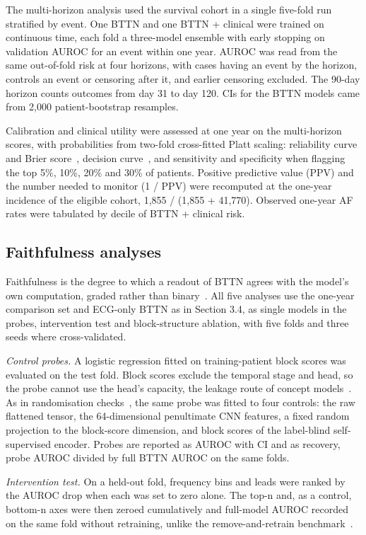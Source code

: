 \documentclass[preprint,12pt]{elsarticle}
\begin{document}
The multi-horizon analysis used the survival cohort in a single five-fold run stratified by event. One BTTN and one BTTN + clinical were trained on continuous time, each fold a three-model ensemble with early stopping on validation AUROC for an event within one year. AUROC was read from the same out-of-fold risk at four horizons, with cases having an event by the horizon, controls an event or censoring after it, and earlier censoring excluded. The 90-day horizon counts outcomes from day 31 to day 120. CIs for the BTTN models came from 2,000 patient-bootstrap resamples.

Calibration and clinical utility were assessed at one year on the multi-horizon scores, with probabilities from two-fold cross-fitted Platt scaling: reliability curve and Brier score~\cite{vancalster2019}, decision curve~\cite{vickers2006}, and sensitivity and specificity when flagging the top 5\%, 10\%, 20\% and 30\% of patients. Positive predictive value (PPV) and the number needed to monitor (1 / PPV) were recomputed at the one-year incidence of the eligible cohort, 1,855 / (1,855 + 41,770). Observed one-year AF rates were tabulated by decile of BTTN + clinical risk.

\subsection{Faithfulness analyses}

Faithfulness is the degree to which a readout of BTTN agrees with the model's own computation, graded rather than binary~\cite{jacovi2020}. All five analyses use the one-year comparison set and ECG-only BTTN as in Section 3.4, as single models in the probes, intervention test and block-structure ablation, with five folds and three seeds where cross-validated.

\textit{Control probes.} A logistic regression fitted on training-patient block scores was evaluated on the test fold. Block scores exclude the temporal stage and head, so the probe cannot use the head's capacity, the leakage route of concept models~\cite{mahinpei2021,havasi2022}. As in randomisation checks~\cite{adebayo2018}, the same probe was fitted to four controls: the raw flattened tensor, the 64-dimensional penultimate CNN features, a fixed random projection to the block-score dimension, and block scores of the label-blind self-supervised encoder. Probes are reported as AUROC with CI and as recovery, probe AUROC divided by full BTTN AUROC on the same folds.

\textit{Intervention test.} On a held-out fold, frequency bins and leads were ranked by the AUROC drop when each was set to zero alone. The top-n and, as a control, bottom-n axes were then zeroed cumulatively and full-model AUROC recorded on the same fold without retraining, unlike the remove-and-retrain benchmark~\cite{hooker2019}.
\end{document}
